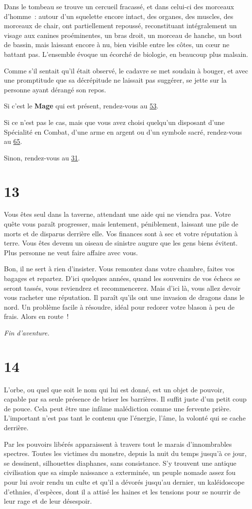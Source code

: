 \documentclass{report}
\newcommand{\gsection}[1]{
    \section{#1}
    \label{section-#1}
}
\newcommand{\glink}[1]{\hyperref[section-#1]{#1}}
\newcommand{\hero}[1]{\textbf{#1}}
\newcommand{\theend}{\emph{Fin d'aventure.}}
\begin{document}
Dans le tombeau se trouve un cercueil fracassé, et dans celui-ci des morceaux d'homme : autour d'un squelette encore intact, des organes, des muscles, des morceaux de chair, ont partiellement repoussé, reconstituant intégralement un visage aux canines proéminentes, un bras droit, un morceau de hanche, un bout de bassin, mais laissant encore à nu, bien visible entre les côtes, un cœur ne battant pas. L'ensemble évoque un écorché de biologie, en beaucoup plus malsain.

Comme s'il sentait qu'il était observé, le cadavre se met soudain à bouger, et avec une promptitude que sa décrépitude ne laissait pas suggérer, se jette sur la personne ayant dérangé son repos.

Si c'est le \hero{Mage} qui est présent, rendez-vous au \glink{53}.

Si ce n'est pas le cas, mais que vous avez choisi quelqu'un disposant d'une Spécialité en Combat, d'une arme en argent ou d'un symbole sacré, rendez-vous au \glink{65}.

Sinon, rendez-vous au \glink{31}.

\gsection{13}

Vous êtes seul dans la taverne, attendant une aide qui ne viendra pas. Votre quête vous paraît progresser, mais lentement, péniblement, laissant une pile de morts et de disparus derrière elle. Vos finances sont à sec et votre réputation à terre. Vous êtes devenu un oiseau de sinistre augure que les gens biens évitent. Plus personne ne veut faire affaire avec vous.

Bon, il ne sert à rien d'insister. Vous remontez dans votre chambre, faites vos bagages et repartez. D'ici quelques années, quand les souvenirs de vos échecs se seront tassés, vous reviendrez et recommencerez. Mais d'ici là, vous allez devoir vous racheter une réputation. Il paraît qu'ils ont une invasion de dragons dans le nord. Un problème facile à résoudre, idéal pour redorer votre blason à peu de frais. Alors en route !

\theend

\gsection{14}

L'orbe, ou quel que soit le nom qui lui est donné, est un objet de pouvoir, capable par sa seule présence de briser les barrières. Il suffit juste d'un petit coup de pouce. Cela peut être une infâme malédiction comme une fervente prière. L'important n'est pas tant le contenu que l'énergie, l'âme, la volonté qui se cache derrière.

Par les pouvoirs libérés apparaissent à travers tout le marais d'innombrables spectres. Toutes les victimes du monstre, depuis la nuit du temps jusqu'à ce jour, se dessinent, silhouettes diaphanes, sans consistance. S'y trouvent une antique civilisation que sa simple naissance a exterminée, un peuple nomade assez fou pour lui avoir rendu un culte et qu'il a dévorés jusqu'au dernier, un kaléidoscope d'ethnies, d'espèces, dont il a attisé les haines et les tensions pour se nourrir de leur rage et de leur désespoir.
\end{document}
